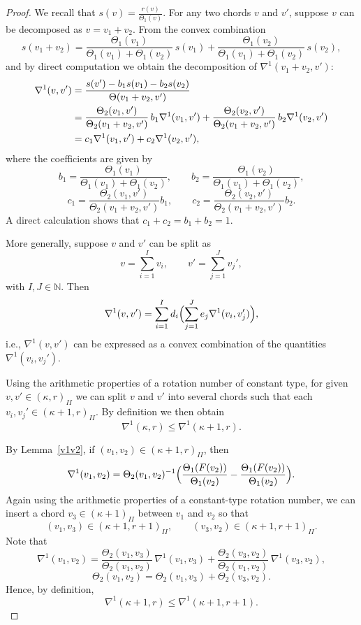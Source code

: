\documentclass{amsart}
\theoremstyle{definition}
\begin{document}
\begin{proof} We recall that \( s(v)=\frac{r(v)}{\Theta_1(v)} \). For any two chords \( v \) and \( v' \), suppose \( v \) can be decomposed as \( v = v_1 + v_2 \). From the convex combination
\[
s(v_1+v_2) = \frac{\Theta_1(v_1)}{\Theta_1(v_1)+\Theta_1(v_2)}\,s(v_1) + \frac{\Theta_1(v_2)}{\Theta_1(v_1)+\Theta_1(v_2)}\,s(v_2),
\]
and by direct computation we obtain the decomposition of \( \nabla^1(v_1+v_2,v') \):
\begin{align}
	\nabla^1(v,v') &= \frac{s(v') - b_1 s(v_1) - b_2 s(v_2)}{\Theta(v_1+v_2,v')} \notag \\
	&= \frac{\Theta_2(v_1,v')}{\Theta_2(v_1+v_2,v')}\,b_1\nabla^1(v_1,v') + \frac{\Theta_2(v_2,v')}{\Theta_2(v_1+v_2,v')}\,b_2\nabla^1(v_2,v') \notag \\
	&= c_1\nabla^1(v_1,v') + c_2\nabla^1(v_2,v'),
\end{align}
where the coefficients are given by
\[
b_1 = \frac{\Theta_1(v_1)}{\Theta_1(v_1)+\Theta_1(v_2)},\qquad
b_2 = \frac{\Theta_1(v_2)}{\Theta_1(v_1)+\Theta_1(v_2)},\]
\[
c_1 = \frac{\Theta_2(v_1,v')}{\Theta_2(v_1+v_2,v')}b_1,\qquad
c_2 = \frac{\Theta_2(v_2,v')}{\Theta_2(v_1+v_2,v')}b_2.
\]
A direct calculation shows that \( c_1+c_2 = b_1+b_2 = 1 \).

More generally, suppose \( v \) and \( v' \) can be split as
\[
v = \sum_{i=1}^{I} v_i,\qquad v' = \sum_{j=1}^{J} v_j',
\]
with \( I,J\in\mathbb{N} \). Then
\[
\nabla^1(v,v') = \sum_{i=1}^{I} d_i\Bigl(\sum_{j=1}^{J} e_j\nabla^1(v_i,v_j')\Bigr),
\]
i.e., \( \nabla^1(v,v') \) can be expressed as a convex combination of the quantities \( \nabla^1(v_i,v_j') \).

{Using the arithmetic properties of a rotation number of constant type, for given \( v,v'\in (\kappa,r)_{II} \) we can split \( v \) and \( v' \) into several chords such that each \( v_i, v_j'\in (\kappa+1,r)_{II} \).} By definition we then obtain
\[
\nabla^1(\kappa,r) \le \nabla^1(\kappa+1,r).
\]

By Lemma~\ref{v1v2}, if \( (v_1,v_2)\in (\kappa+1,r)_{II} \), then
\[
\nabla^1(v_1,v_2)=\Theta_2(v_1,v_2)^{-1}\Bigl(\frac{\Theta_1(F(v_2))}{\Theta_1(v_2)}-\frac{\Theta_1(F(v_2))}{\Theta_1(v_2)}\Bigr).
\]
{Again using the arithmetic properties of a constant-type rotation number, we can insert a chord \( v_3\in (\kappa+1)_{II} \) between \( v_1 \) and \( v_2 \) so that
	\[
	(v_1,v_3)\in (\kappa+1,r+1)_{II},\qquad (v_3,v_2)\in (\kappa+1,r+1)_{II}.
	\]}
Note that
\[
\nabla^1(v_1,v_2)=\frac{\Theta_2(v_1,v_3)}{\Theta_2(v_1,v_2)}\,\nabla^1(v_1,v_3)+\frac{\Theta_2(v_3,v_2)}{\Theta_2(v_1,v_2)}\,\nabla^1(v_3,v_2),\]
\[\Theta_2(v_1,v_2)=\Theta_2(v_1,v_3)+\Theta_2(v_3,v_2).
\]
Hence, by definition,
\[
\nabla^1(\kappa+1,r)\le \nabla^1(\kappa+1,r+1).
\]
\end{proof}
\end{document}
